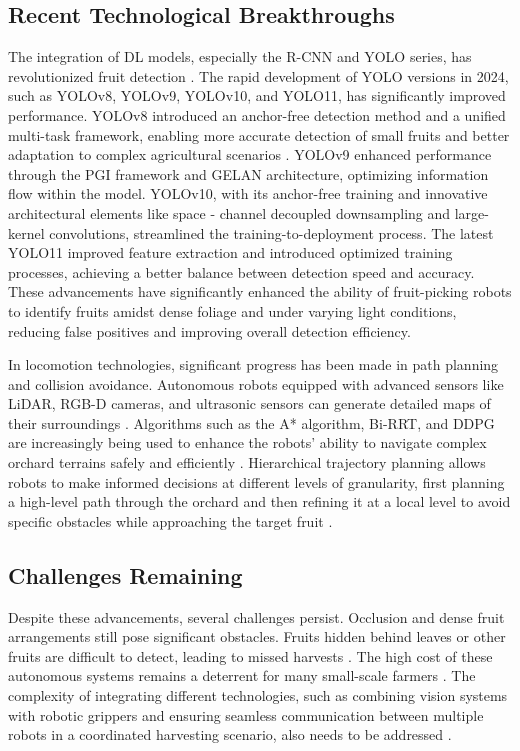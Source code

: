 \documentclass[a4paper,fleqn]{cas-dc}
\begin{document}
\subsection{ Recent Technological Breakthroughs }
The integration of DL models, especially the R-CNN and YOLO series, has revolutionized fruit detection \cite{hou2023overview, suresh2023selective}. The rapid development of YOLO versions in 2024, such as YOLOv8, YOLOv9, YOLOv10, and YOLO11, has significantly improved performance. YOLOv8 introduced an anchor-free detection method and a unified multi-task framework, enabling more accurate detection of small fruits and better adaptation to complex agricultural scenarios \cite{li2023mta}. YOLOv9 enhanced performance through the PGI framework and GELAN architecture, optimizing information flow within the model. YOLOv10, with its anchor-free training and innovative architectural elements like space - channel decoupled downsampling and large-kernel convolutions, streamlined the training-to-deployment process. The latest YOLO11 improved feature extraction and introduced optimized training processes, achieving a better balance between detection speed and accuracy. These advancements have significantly enhanced the ability of fruit-picking robots to identify fruits amidst dense foliage and under varying light conditions, reducing false positives and improving overall detection efficiency.

In locomotion technologies, significant progress has been made in path planning and collision avoidance. Autonomous robots equipped with advanced sensors like LiDAR, RGB-D cameras, and ultrasonic sensors can generate detailed maps of their surroundings \cite{liu2024hierarchical}. Algorithms such as the A* algorithm, Bi-RRT, and DDPG are increasingly being used to enhance the robots' ability to navigate complex orchard terrains safely and efficiently \cite{gai2022fruit, rajendran2024towards}. Hierarchical trajectory planning allows robots to make informed decisions at different levels of granularity, first planning a high-level path through the orchard and then refining it at a local level to avoid specific obstacles while approaching the target fruit \cite{liu2024hierarchical}.

\subsection{ Challenges Remaining}
Despite these advancements, several challenges persist. Occlusion and dense fruit arrangements still pose significant obstacles. Fruits hidden behind leaves or other fruits are difficult to detect, leading to missed harvests \cite{hou2023overview, suresh2023selective}. The high cost of these autonomous systems remains a deterrent for many small-scale farmers \cite{zhang2024automatic}. The complexity of integrating different technologies, such as combining vision systems with robotic grippers and ensuring seamless communication between multiple robots in a coordinated harvesting scenario, also needs to be addressed \cite{li2023multi, rajendran2024towards}.
\end{document}
